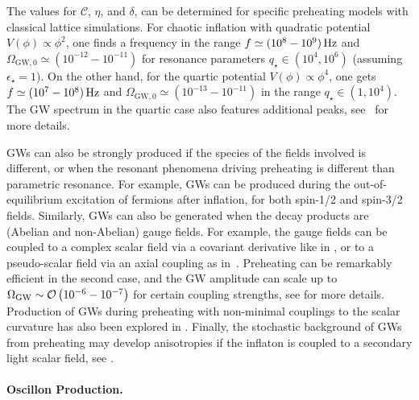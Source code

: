 \documentclass[11pt,a4paper]{article}
\begin{document}
The values for $\mathcal{C}$, $\eta$, and $\delta$, can be determined for specific preheating models with classical lattice simulations. For chaotic inflation with quadratic potential $V(\phi) \propto \phi^2$, one finds a frequency in the range $f \simeq (10^8 - 10^9) \, {\rm Hz}$ and $\Omega_{\text{GW},0} \simeq (10^{-12} - 10^{-11})$ for resonance parameters $q_{\star} \in (10^4,10^6)$ (assuming $\epsilon_{\star} = 1$). On the other hand, for the quartic potential $V(\phi) \propto \phi^4$, one gets $f \simeq (10^7 - 10^8)  \,  {\rm Hz}$  and $\Omega_{\text{GW}, 0} \simeq (10^{-13} - 10^{-11}) $ in the range $q_{\star} \in (1,10^4)$. The GW spectrum in the quartic case also features additional peaks, see~\cite{Figueroa:2017vfa} for more details.

GWs can also be strongly produced if the species of the fields involved is different, or when the resonant phenomena driving preheating is different than parametric resonance. For example, GWs can be produced during the out-of-equilibrium excitation of fermions after inflation, for both spin-1/2 \cite{Enqvist:2012im,Figueroa:2013vif,Figueroa:2014aya} and spin-3/2 \cite{Benakli:2018xdi} fields. Similarly, GWs can also be generated when the decay products are (Abelian and non-Abelian) gauge fields. For example, the gauge fields can be coupled to a complex scalar field via a covariant derivative like in \cite{Dufaux:2010cf,Figueroa:2016ojl,Tranberg:2017lrx}, or to a pseudo-scalar field via an axial coupling as in~\cite{Adshead:2018doq,Adshead:2019igv,Adshead:2019lbr}. Preheating can be remarkably efficient in the second case, and the GW amplitude can scale up to $\Omega_{\rm GW} \sim \mathcal{O} \left(10^{-6} - 10^{-7}\right)$ for certain coupling strengths, see \cite{Adshead:2019igv,Adshead:2019lbr} for more details. Production of GWs during preheating with non-minimal couplings to the scalar curvature has also been explored in \cite{Fu:2017ero}. Finally, the stochastic background of GWs from preheating may develop anisotropies if the inflaton is coupled to a secondary light scalar field, see \cite{Bethke:2013aba, Bethke:2013vca}.


\paragraph{Oscillon Production.}
\end{document}
